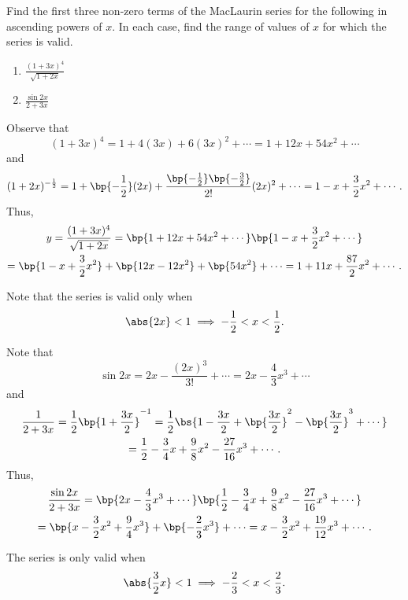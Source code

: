 \begin{problem}
    Find the first three non-zero terms of the MacLaurin series for the following in ascending powers of $x$. In each case, find the range of values of $x$ for which the series is valid.

    \begin{enumerate}
        \item $\frac{(1+3x)^4}{\sqrt{1+2x}}$
        \item $\frac{\sin 2x}{2 + 3x}$
    \end{enumerate}
\end{problem}
\clearpage
\begin{solution}
    \begin{ppart}
        Observe that \[(1 + 3x)^4 = 1 + 4(3x) + 6(3x)^2 + \cdots = 1 + 12x + 54x^2 + \cdots\] and \[(1 + 2x)^{-\frac12} = 1 + \bp{-\frac{1}{2}}(2x) + \frac{\bp{-\frac{1}{2}}\bp{-\frac{3}{2}}}{2!} (2x)^2 + \cdots = 1 - x + \frac32 x^2 + \cdots.\] Thus,
        \begin{gather*}
            y = \frac{(1+3x)^4}{\sqrt{1 + 2x}} = \bp{1 + 12x + 54x^2 + \cdots}\bp{1 - x + \frac32 x^2 + \cdots}\\
            = \bp{1 - x + \frac32 x^2} + \bp{12x - 12x^2} + \bp{54x^2} + \cdots = 1 + 11x + \frac{87}{2} x^2 + \cdots.
        \end{gather*}

        Note that the series is valid only when \[\abs{2x} < 1 \implies -\frac12 < x < \frac12.\]
    \end{ppart}
    \begin{ppart}
        Note that \[\sin 2x = 2x - \frac{(2x)^3}{3!} + \cdots = 2x - \frac43 x^3 + \cdots\] and \begin{gather*}
            \frac{1}{2 + 3x} = \frac12 \bp{1 + \frac{3x}{2}}^{-1} = \frac12 \bs{1 - \frac{3x}{2} +  \bp{\frac{3x}{2}}^2 - \bp{\frac{3x}{2}}^3 + \cdots}\\ = \frac12 - \frac34 x + \frac98 x^2 - \frac{27}{16} x^3 + \cdots.
        \end{gather*}
        Thus, 
        \begin{gather*}
            \frac{\sin 2x}{2 + 3x} = \bp{2x - \frac43 x^3 + \cdots}\bp{\frac12 - \frac34 x + \frac98 x^2 - \frac{27}{16} x^3 + \cdots}\\
            = \bp{x - \frac32 x^2 + \frac94 x^3} + \bp{-\frac23 x^3} + \cdots = x - \frac32 x^2 + \frac{19}{12} x^3 + \cdots.
        \end{gather*}

        The series is only valid when \[\abs{\frac32 x} < 1 \implies -\frac23 < x < \frac23.\]
    \end{ppart}
\end{solution}

